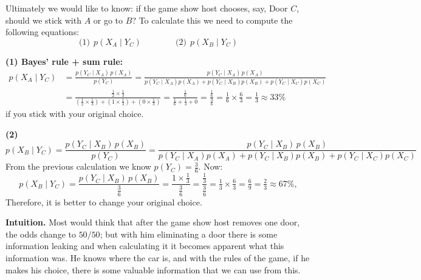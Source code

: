 \medskip
\noindent
Ultimately we would like to know: if the game show host chooses, say, Door $C$, should we stick with $A$ or go to $B$? To calculate this we need to compute the following equations:
\[
\text{(1)}\ \ p(X_A\mid Y_C) \qquad\qquad \text{(2)}\ \ p(X_B \mid Y_C)
\]

\medskip
\noindent
\textbf{(1) Bayes' rule + sum rule:}
\begin{align*}
p(X_A\mid Y_C) &= \frac{p(Y_C\mid X_A)\,p(X_A)}{p(Y_C)}
= \frac{p(Y_C\mid X_A)\,p(X_A)}{p(Y_C\mid X_A)p(X_A)+p(Y_C\mid X_B)p(X_B)+p(Y_C\mid X_C)p(X_C)} \\[8pt]
&= \frac{\tfrac12\times\tfrac13}{\left(\tfrac12\times\tfrac13\right)+\left(1\times\tfrac13\right)+\left(0\times\tfrac13\right)}
= \frac{\tfrac16}{\tfrac16+\tfrac13+0}
= \frac{\tfrac16}{\tfrac36}
= \tfrac16 \times \tfrac63 = \tfrac13 \approx 33\%
\end{align*}
if you stick with your original choice.

\medskip
\noindent
\textbf{(2)}
\[
p(X_B\mid Y_C) = \frac{p(Y_C\mid X_B)\,p(X_B)}{p(Y_C)}
= \frac{p(Y_C\mid X_B)\,p(X_B)}{p(Y_C\mid X_A)p(X_A)+p(Y_C\mid X_B)p(X_B)+p(Y_C\mid X_C)p(X_C)}
\]
From the previous calculation we know $p(Y_C) = \tfrac36$. Now:
\[
p(X_B\mid Y_C) = \frac{p(Y_C\mid X_B)\,p(X_B)}{\tfrac36}
= \frac{1\times\tfrac13}{\tfrac36}
= \frac{\tfrac13}{\tfrac36}
= \tfrac13\times\tfrac63 = \tfrac69 = \boxed{\tfrac23}
\approx 67\%,
\]
Therefore, it is better to change your original choice.

\medskip
\noindent
\textbf{Intuition.} Most would think that after the game show host removes one door, the odds change to $50/50$; but with him eliminating a door there is some information leaking and when calculating it it becomes apparent what this information was. He knows where the car is, and with the rules of the game, if he makes his choice, there is some valuable information that we can use from this.


